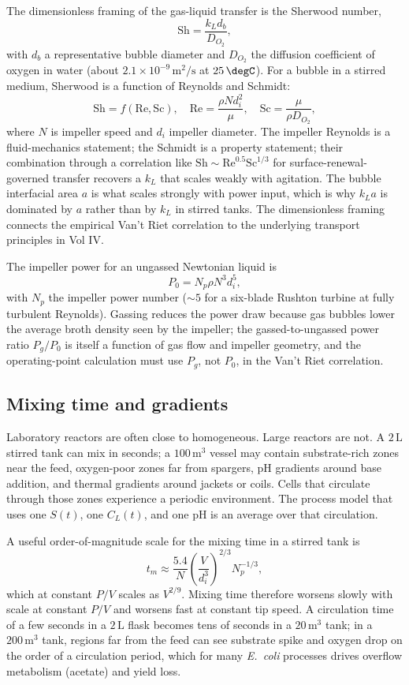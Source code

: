 The dimensionless framing of the gas-liquid transfer is the Sherwood
number,
\[
\text{Sh} = \frac{k_L d_b}{D_{O_2}},
\]
with $d_b$ a representative bubble diameter and $D_{O_2}$ the diffusion
coefficient of oxygen in water (about $2.1 \times 10^{-9}\,\text{m}^2/\text{s}$
at $25\,\degC$). For a bubble in a stirred medium, Sherwood is a
function of Reynolds and Schmidt:
\[
\text{Sh} = f(\text{Re}, \text{Sc}),
\quad
\text{Re} = \frac{\rho N d_i^2}{\mu},
\quad
\text{Sc} = \frac{\mu}{\rho D_{O_2}},
\]
where $N$ is impeller speed and $d_i$ impeller diameter. The impeller
Reynolds is a fluid-mechanics statement; the Schmidt is a property
statement; their combination through a correlation like
$\text{Sh} \sim \text{Re}^{0.5}\text{Sc}^{1/3}$ for surface-renewal-
governed transfer recovers a $k_L$ that scales weakly with agitation.
The bubble interfacial area $a$ is what scales strongly with power
input, which is why $k_L a$ is dominated by $a$ rather than by $k_L$ in
stirred tanks. The dimensionless framing connects the empirical Van't
Riet correlation to the underlying transport principles in Vol IV.

The impeller power for an ungassed Newtonian liquid is
\[
P_0 = N_p \rho N^3 d_i^5,
\]
with $N_p$ the impeller power number ($\sim 5$ for a six-blade Rushton
turbine at fully turbulent Reynolds). Gassing reduces the power draw
because gas bubbles lower the average broth density seen by the
impeller; the gassed-to-ungassed power ratio $P_g / P_0$ is itself a
function of gas flow and impeller geometry, and the operating-point
calculation must use $P_g$, not $P_0$, in the Van't Riet correlation.

\subsection{Mixing time and gradients}

Laboratory reactors are often close to homogeneous. Large reactors are
not. A $2\,\text{L}$ stirred tank can mix in seconds; a
$100\,\text{m}^3$ vessel may contain substrate-rich zones near the feed,
oxygen-poor zones far from spargers, pH gradients around base addition,
and thermal gradients around jackets or coils. Cells that circulate
through those zones experience a periodic environment. The process
model that uses one $S(t)$, one $C_L(t)$, and one pH is an average over
that circulation.

A useful order-of-magnitude scale for the mixing time in a stirred tank
is
\[
t_m \approx \frac{5.4}{N}\left(\frac{V}{d_i^3}\right)^{2/3} N_p^{-1/3},
\]
which at constant $P/V$ scales as $V^{2/9}$. Mixing time therefore
worsens slowly with scale at constant $P/V$ and worsens fast at
constant tip speed. A circulation time of a few seconds in a $2\,\text{L}$
flask becomes tens of seconds in a $20\,\text{m}^3$ tank; in a
$200\,\text{m}^3$ tank, regions far from the feed can see substrate
spike and oxygen drop on the order of a circulation period, which for
many \emph{E.\ coli} processes drives overflow metabolism (acetate) and
yield loss.

